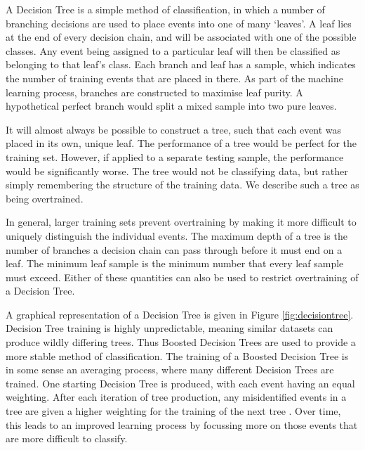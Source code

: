 \documentclass[11pt]{article}
\begin{document}
A Decision Tree is a simple method of classification, in which a number of branching decisions are used to place events into one of many \textquoteleft leaves'. A leaf lies at the end of every decision chain, and will be associated with one of the possible classes. Any event being assigned to a particular leaf will then be classified as belonging to that leaf's class. Each branch and leaf has a sample, which indicates the number of training events that are placed in there. As part of the machine learning process, branches are constructed to maximise leaf purity. A hypothetical perfect branch would split a mixed sample into two pure leaves. 

It will almost always be possible to construct a tree, such that each event was placed in its own, unique leaf. The performance of a tree would be perfect for the training set. However, if applied to a separate testing sample, the performance would be significantly worse. The tree would not be classifying data, but rather simply remembering the structure of the training data. We describe such a tree as being overtrained.

In general, larger training sets prevent overtraining by making it more difficult to uniquely distinguish the individual events. The maximum depth of a tree is the number of branches a decision chain can pass through before it must end on a leaf. The minimum leaf sample is the minimum number that every leaf sample must exceed. Either of these quantities can also be used to restrict overtraining of a Decision Tree.

A graphical representation of a Decision Tree is given in Figure \ref{fig:decisiontree}. Decision Tree training is highly unpredictable, meaning similar datasets can produce wildly differing trees. Thus Boosted Decision Trees are used to provide a more stable method of classification. The training of a Boosted Decision Tree is in some sense an averaging process, where many different Decision Trees are trained. One starting Decision Tree is produced, with each event having an equal weighting. After each iteration of tree production, any misidentified events in a tree are given a higher weighting for the training of the next tree \cite{Roe:2004na}. Over time, this leads to an improved learning process by focussing more on those events that are more difficult to classify.
\end{document}
